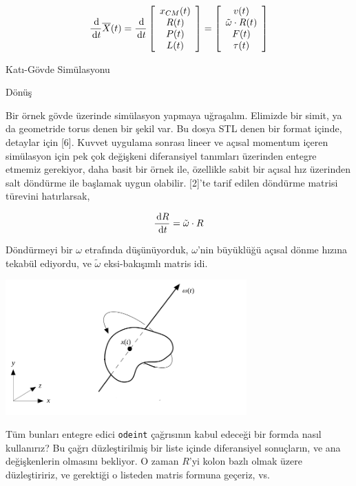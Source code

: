 \documentclass[12pt,fleqn]{article}\usepackage{../../common}
\begin{document}
$$
\frac{\,\mathrm{d}}{\,\mathrm{d} t} \overline{X}(t) =
\frac{\,\mathrm{d}}{\,\mathrm{d} t}
\left[\begin{array}{c}
x_{CM}(t) \\ R(t) \\ P(t) \\ L(t)
\end{array}\right]
=
\left[\begin{array}{c}
v(t) \\ \tilde \omega \cdot R(t) \\ F(t) \\ \tau(t)
\end{array}\right]
$$

Katı-Gövde Simülasyonu

Dönüş

Bir örnek gövde üzerinde simülasyon yapmaya uğraşalım. Elimizde bir simit, ya da
geometride torus denen bir şekil var. Bu dosya STL denen bir format içinde,
detaylar için [6]. Kuvvet uygulama sonrası lineer ve açısal momentum içeren
simülasyon için pek çok değişkeni diferansiyel tanımları üzerinden entegre
etmemiz gerekiyor, daha basit bir örnek ile, özellikle sabit bir açısal hız
üzerinden salt döndürme ile başlamak uygun olabilir. [2]'te tarif edilen
döndürme matrisi türevini hatırlarsak,

$$
\frac{\,\mathrm{d} R}{\,\mathrm{d} t} = \tilde \omega \cdot R
$$

Döndürmeyi bir $\omega$ etrafında düşünüyorduk, $\omega$'nin büyüklüğü
açısal dönme hızına tekabül ediyordu, ve $\tilde \omega$ eksi-bakışımlı
matris idi.

\includegraphics[width=25em]{compscieng_bpp32sim_rigbod_01.png}

Tüm bunları entegre edici \verb!odeint! çağrısının kabul edeceği bir formda
nasıl kullanırız? Bu çağrı düzleştirilmiş bir liste içinde diferansiyel
sonuçların, ve ana değişkenlerin olmasını bekliyor. O zaman $R$'yi kolon bazlı
olmak üzere düzleştiririz, ve gerektiği o listeden matris formuna geçeriz, vs.
\end{document}
